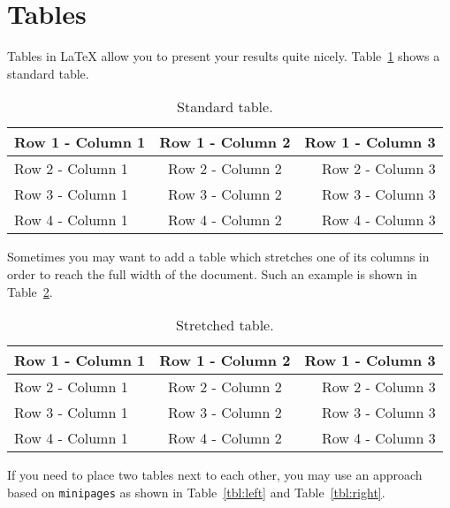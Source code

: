 \section{Tables}
\label{sec:tables}

Tables in \LaTeX{} allow you to present your results quite
nicely. Table~\ref{tab:std_table} shows a standard table.

\begin{table}[htbp]
 \caption{Standard table.}
 \label{tab:std_table}
 \centering\begin{tabular}{@{}lcr@{}} \toprule
  \textbf{Row 1 - Column 1} & \textbf{Row 1 - Column 2} & \textbf{Row 1 - Column 3} \\ \midrule
  Row 2 - Column 1 & Row 2 - Column 2 & Row 2 - Column 3 \\
  Row 3 - Column 1 & Row 3 - Column 2 & Row 3 - Column 3 \\
  Row 4 - Column 1 & Row 4 - Column 2 & Row 4 - Column 3 \\ \bottomrule
 \end{tabular}
\end{table}

Sometimes you may want to add a table which stretches one of its
columns in order to reach the full width of the document. Such an
example is shown in Table~\ref{tab:stretched_table}.

\begin{table}[htbp]
 \caption{Stretched table.}
 \label{tab:stretched_table}
 \centering\begin{tabularx}{1.0\linewidth}{@{}Xcr@{}} \toprule
  \textbf{Row 1 - Column 1} & \textbf{Row 1 - Column 2} & \textbf{Row 1 - Column 3} \\ \midrule
  Row 2 - Column 1 & Row 2 - Column 2 & Row 2 - Column 3 \\
  Row 3 - Column 1 & Row 3 - Column 2 & Row 3 - Column 3 \\
  Row 4 - Column 1 & Row 4 - Column 2 & Row 4 - Column 3 \\ \bottomrule
 \end{tabularx}
\end{table}

If you need to place two tables next to each other, you may use an
approach based on \texttt{minipages} as shown in Table~\ref{tbl:left}
and Table~\ref{tbl:right}.


